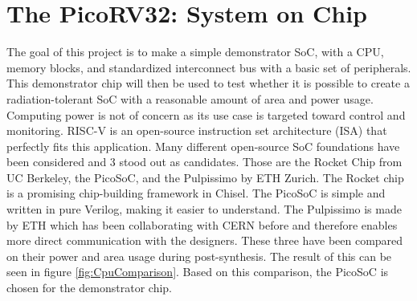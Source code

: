 \section{The PicoRV32: System on Chip}
\label{picorv_desc}
The goal of this project is to make a simple demonstrator SoC, with a CPU, memory blocks, and standardized interconnect bus with a basic set of peripherals. This demonstrator chip will then be used to test whether it is possible to create a radiation-tolerant SoC with a reasonable amount of area and power usage. Computing power is not of concern as its use case is targeted toward control and monitoring. RISC-V is an open-source instruction set architecture (ISA) that perfectly fits this application. Many different open-source SoC foundations have been considered and 3 stood out as candidates. Those are the Rocket Chip from UC Berkeley, the PicoSoC, and the Pulpissimo by ETH Zurich. The Rocket chip is a promising chip-building framework in Chisel. The PicoSoC is simple and written in pure Verilog, making it easier to understand. The Pulpissimo is made by ETH which has been collaborating with CERN before and therefore enables more direct communication with the designers. These three have been compared on their power and area usage during post-synthesis. The result of this can be seen in figure \ref{fig:CpuComparison}. Based on this comparison, the PicoSoC is chosen for the demonstrator chip.


